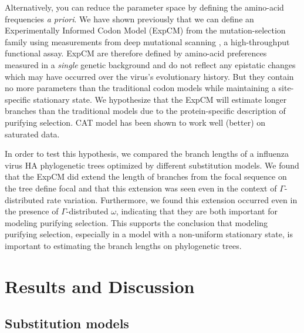 \documentclass[11pt]{article}
\newcommand\skhcomment[1]{{\color{magenta}#1}}
\begin{document}
Alternatively, you can reduce the parameter space by defining the amino-acid frequencies \textit{a priori}. 
We have shown previously that we can define an Experimentally Informed Codon Model (ExpCM) \citep{bloom2014experimentally,bloom2014informed} from the mutation-selection family using measurements from deep mutational scanning \citep{fowler2014deep}, a high-throughput functional assay. 
ExpCM are therefore defined by amino-acid preferences measured in a \textit{single} genetic background and do not reflect any epistatic changes which may have occurred over the virus's evolutionary history. 
But they contain no more parameters than the traditional codon models while maintaining a site-specific stationary state. 
We hypothesize that the ExpCM will estimate longer branches than the traditional models due to the protein-specific description of purifying selection. 
\skhcomment{CAT model has been shown to work well (better) on saturated data.}

In order to test this hypothesis, we compared the branch lengths of a influenza virus HA phylogenetic trees optimized by different substitution models. 
We found that the ExpCM did extend the length of branches from the focal sequence on the tree \skhcomment{define focal} and that this extension was seen even in the context of $\Gamma$-distributed rate variation. 
Furthermore, we found this extension occurred even in the presence of $\Gamma$-distributed $\omega$, indicating that they are both important for modeling purifying selection. 
This supports the conclusion that modeling purifying selection, especially in a model with a non-uniform stationary state, is important to estimating the branch lengths on phylogenetic trees. 

\section*{Results and Discussion}

\subsection*{Substitution models}
\end{document}
